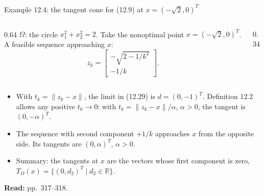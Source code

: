 \documentclass[aspectratio=169,12pt]{beamer}
\newcommand{\R}{\mathbb{R}}
\newcommand{\readbook}[1]{{\color{red}\textbf{Read:} #1}}
\newcommand{\TO}{T_{\Omega}}
\begin{document}
\begin{frame}{Example 12.4: the tangent cone for (12.9) at $x=(-\sqrt2,0)^{T}$}
  \begin{columns}[T,totalwidth=\textwidth]
    \begin{column}{0.64\textwidth}
      $\Omega$: the circle $x_{1}^{2}+x_{2}^{2}=2$. Take the nonoptimal point $x=(-\sqrt2,0)^{T}$.
      A feasible sequence approaching $x$:
      \[ z_{k}=\begin{bmatrix}-\sqrt{2-1/k^{2}}\\[0.1em] -1/k\end{bmatrix} . \tag{12.30} \]
    \end{column}
    \begin{column}{0.34\textwidth}
      \centering
    \end{column}
  \end{columns}
  \begin{itemize}\setlength\itemsep{0.4em}
    \item With $t_{k}=\|z_{k}-x\|$, the limit in (12.29) is $d=(0,-1)^{T}$. Definition 12.2 allows any
      positive $t_{k}\to 0$: with $t_{k}=\|z_{k}-x\|/\alpha$, $\alpha>0$, the tangent is $(0,-\alpha)^{T}$.
    \item The sequence with second component $+1/k$ approaches $x$ from the opposite side.
      Its tangents are $(0,\alpha)^{T}$, $\alpha>0$.
    \item Summary: the tangents at $x$ are the vectors whose first component is zero,
      $\TO(x)=\{(0,d_{2})^{T}\mid d_{2}\in\R\}$.
  \end{itemize}
  \readbook{pp.~317--318.}
\end{frame}
\end{document}
